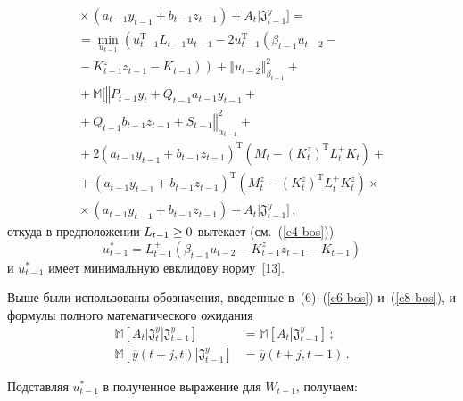 \begin{multicols}{2}
\begin{multline*}
{}\times
\left( a_{t-1} y_{t-1} + b_{t-1} z_{t-1} \right) +A_t
\Big\vert
\mathfrak{J}_{t-1}^y \Big] ={}\\
= \min\limits_{u_{t-1}}
\left( u_{t-1}^{\mathrm{T}} L_{t-1} u_{t-1} -
2 u_{t-1}^{\mathrm{T}} \left( \beta_{t-1} u_{t-2} -{}\right.\right.\\
\left.\left.{}- K_{t-1}^z
z_{t-1} - K_{t-1} \right)\right) +
\left\Vert u_{t-2} \right\Vert^2_{\beta_{t-1}} +{}\\
{}+ \mathbb{M} \Big[
\left\Vert P_{t-1} y_t + Q_{t-1}a_{t-1} y_{t-1} +{}\right.\\
\left.{}+ Q_{t-1} b_{t-1} z_{t-1} +
 S_{t-1} \right\Vert^2_{\alpha_{t-1}} +{}\\
{}+ 2\left( a_{t-1} y_{t-1} + b_{t-1} z_{t-1} \right)^{\mathrm{T}}
\left(M_t - \left( K_t^z\right)^{\mathrm{T}} L_t^+ K_t \right) +{}\\
{}+ \left( a_{t-1} y_{t-1} + b_{t-1} z_{t-1} \right)^{\mathrm{T}}
\left(M_t^z - \left( K_t^z\right)^{\mathrm{T}} L_t^+ K_t^z \right)\times{}\\
{}\times
\left( a_{t-1} y_{t-1} + b_{t-1} z_{t-1} \right) +A_t
\Big\vert
\mathfrak{J}_{t-1}^y \Big] \,,
\end{multline*}
откуда в предположении $L_{t-1}\hm\geq 0$ вытекает (см.~(\ref{e4-bos}))
\begin{equation}
u^*_{t-1} = L^+_{t-1} \left( \beta_{t-1} u_{t-2} - K^z_{t-1} z_{t-1} - K_{t-1}\right)
\label{e13-bos}
\end{equation}
и $u_{t-1}^*$ имеет минимальную евклидову норму~[13].

 Выше были использованы обозначения, введенные в~(6)--(\ref{e6-bos})
и~(\ref{e8-bos}), и формулы полного математического ожидания
\begin{align*}
 \mathbb{M}\left[\left. A_t \right\vert \left.\mathfrak{J}_t^y \right\vert
\mathfrak{J}_{t-1}^y \right] &= \mathbb{M}\left[ A_t \left\vert \mathfrak{J}_{t-1}^y
\right. \right]\,;
\\
 \mathbb{M}\left[\overline{y} \left( t +j, t\right) \left\vert
\mathfrak{J}_{t-1}^y \right. \right]& = \overline{y} \left( t+j, t-1\right)\,.
 \end{align*}

 Подставляя $u_{t-1}^*$ в полученное выражение для $W_{t-1}$,
получаем:

\pagebreak


\end{multicols}
